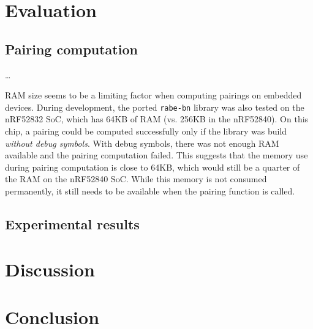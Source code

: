 \chapter{Evaluation}

\section{Pairing computation}
\dots

RAM size seems to be a limiting factor when computing pairings on embedded devices.
During development, the ported \texttt{rabe-bn} library was also tested on the nRF52832 SoC, which has 64KB of RAM (vs. 256KB in the nRF52840). 
On this chip, a pairing could be computed successfully only if the library was build \emph{without debug symbols}.
With debug symbols, there was not enough RAM available and the pairing computation failed.
This suggests that the memory use during pairing computation is close to 64KB, which would still be a quarter of the RAM on the nRF52840 SoC.
While this memory is not consumed permanently, it still needs to be available when the pairing function is called.

\section{Experimental results}

\chapter{Discussion}

\chapter{Conclusion}